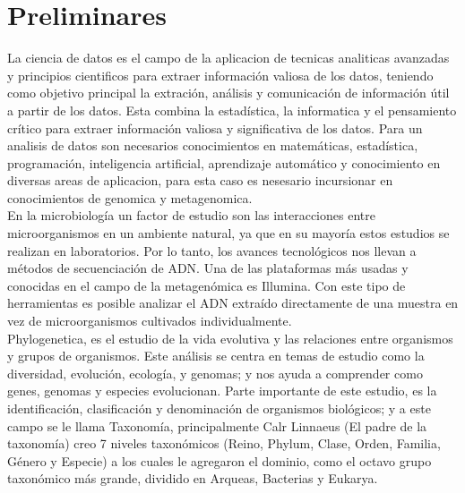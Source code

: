 \chapter{Preliminares}

La ciencia de datos es el campo de la aplicacion de tecnicas analiticas avanzadas y principios cientificos para extraer información valiosa de los datos,  teniendo como objetivo principal la extración, análisis y comunicación de información útil a partir de los datos. Esta combina la estadística, la informatica y el pensamiento crítico para extraer información valiosa y significativa de los datos. Para un analisis de datos son necesarios conocimientos en matemáticas, estadística, programación, inteligencia artificial, aprendizaje automático y conocimiento en diversas areas de aplicacion, para esta caso es nesesario incursionar en conocimientos de genomica y metagenomica.\\

En la microbiología un factor de estudio son las interacciones entre microorganismos en un ambiente natural, ya que en su mayoría estos estudios se realizan en laboratorios. Por lo tanto, los avances tecnológicos nos llevan a métodos de secuenciación de ADN. Una de las plataformas más usadas y conocidas en el campo de la metagenómica es Illumina. Con este tipo de herramientas es posible analizar el ADN extraído directamente de una muestra en vez de microorganismos cultivados individualmente. \\

Phylogenetica, es el estudio de la vida evolutiva y las relaciones entre organismos y grupos de organismos. Este análisis se centra en temas de estudio como la diversidad, evolución, ecología, y genomas; y nos ayuda a comprender como genes, genomas y especies evolucionan. Parte importante de este estudio, es la identificación, clasificación y denominación de organismos biológicos; y a este campo se le llama Taxonomía,  principalmente Calr Linnaeus (El padre de la taxonomía) creo 7 niveles taxonómicos (Reino, Phylum, Clase, Orden, Familia, Género y Especie) a los cuales le agregaron el dominio, como el octavo grupo taxonómico más grande, dividido en Arqueas, Bacterias y Eukarya. \\

